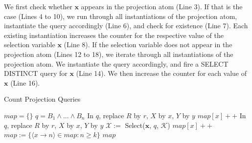 We first check whether $\bm{x}$ appears in the projection atom (Line 3).
If that is the case (Lines 4 to 10), we run through all instantiations of the projection atom, instantiate the query accordingly (Line 6), and check for existence (Line 7).
Each existing instantiation increases the counter for the respective value of the selection variable $\bm{x}$ (Line 8). 
If the selection variable does not appear in the projection atom (Lines 12 to 18), 
we iterate through all instantiations of the projection atom.
We instantiate the query accordingly, and fire a SELECT DISTINCT query for $\bm{x}$ (Line 14). 
We then increase the counter for each value of $\bm{x}$ (Line 16).

\begin{algorithm}
\caption{Count Projection Queries}
\label{algi}
\begin{algorithmic}[1]
    \State $map = \{\}$
    \State $q=B_1 \wedge ... \wedge B_n$
	    \State In $q$, replace $R$ by $r$, $X$ by $x$, $Y$ by $y$
		\State $map[x]++$
	    \EndIf
	  \EndFor
	\Else
	    \State In $q$, replace $R$ by $r$, $X$ by $x$, $Y$ by $y$
	    \State $\mathcal{X} :=$ Select($\bm{x}$, $q$, $\mathcal{K}$)
		  \State $map[x]++$
	    \EndFor
	  \EndFor
	\EndIf
	\State $map := \{ \langle x \rightarrow n\rangle \in map : n \geq k\}$
	\State \Return $map$
\EndFunction
\end{algorithmic}
\end{algorithm}


